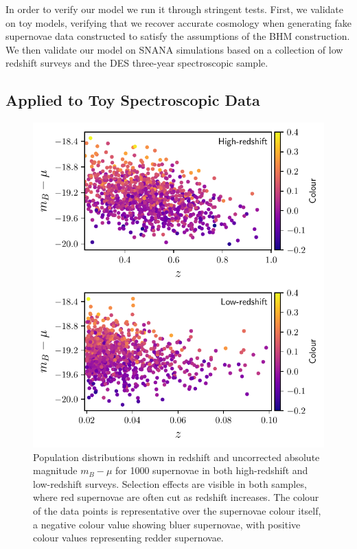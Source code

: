 \documentclass[a4paper,fleqn,usenatbib]{mnras}
\newcommand{\green}{\color{forestgreen}}
\begin{document}
In order to verify our model we run it through stringent tests. First, we validate on toy models, verifying that we recover accurate cosmology {\green when generating fake supernovae data constructed to satisfy the assumptions of the BHM construction}. We then validate our model on SNANA simulations based on a collection of low redshift surveys and the DES three-year spectroscopic sample.

\subsection{Applied to Toy Spectroscopic Data}
\label{sec:toy}


\begin{figure}
	\begin{center}
		\includegraphics[width=\columnwidth]{plot_pop_simple.pdf}
	\end{center}
	\caption{Population distributions shown in redshift and uncorrected absolute magnitude $m_B - \mu$ for 1000 supernovae in both high-redshift and low-redshift surveys. Selection effects are visible in both samples, where red supernovae are often cut as redshift increases. The colour of the data points is representative over the supernovae colour itself, a negative colour value showing bluer supernovae, with positive colour values representing redder supernovae.}
	\label{fig:simple_pop}
\end{figure}
\end{document}
